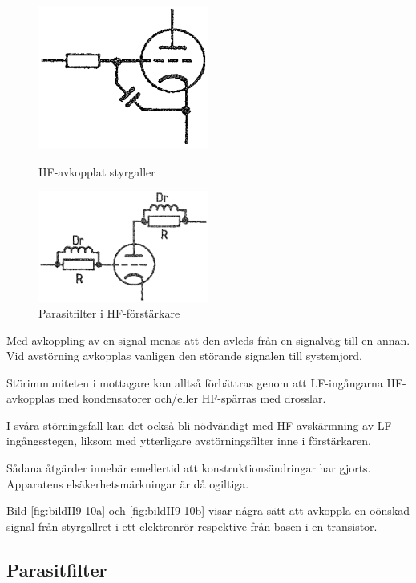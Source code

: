 \begin{figure}
  \includegraphics[width=0.5\textwidth]{images/cropped_pdfs/bild_2_9-10a.pdf}
  \caption{HF-avkopplat styrgaller}
  \label{fig:bildII9-10a}

  \includegraphics[width=0.5\textwidth]{images/cropped_pdfs/bild_2_9-11.pdf}
  \caption{Parasitfilter i HF-förstärkare}
  \label{fig:bildII9-11}
\end{figure}

Med avkoppling av en signal menas att den avleds från en signalväg till en
annan.
Vid avstörning avkopplas vanligen den störande signalen till systemjord.

Störimmuniteten i mottagare kan alltså förbättras genom att LF-ingångarna
HF-avkopplas med kondensatorer och/eller HF-spärras med drosslar.

I svåra störningsfall kan det också bli nödvändigt med HF-avskärmning av
LF-ingångsstegen, liksom med ytterligare avstörningsfilter inne i förstärkaren.

Sådana åtgärder innebär emellertid att konstruktionsändringar har gjorts.
Apparatens elsäkerhetsmärkningar är då ogiltiga.

Bild \ref{fig:bildII9-10a} och \ref{fig:bildII9-10b} visar några sätt att
avkoppla en oönskad signal från styrgallret i ett elektronrör respektive från
basen i en transistor.

\subsection{Parasitfilter}

